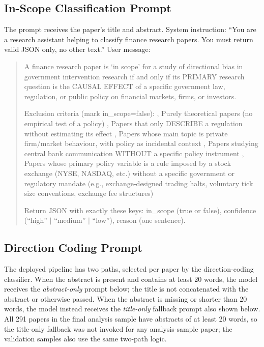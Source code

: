\documentclass[12pt]{article}
\begin{document}
\subsection{In-Scope Classification Prompt}

The prompt receives the paper's title and abstract.
System instruction: ``You are a research assistant helping to classify
finance research papers. You must return valid JSON only, no other text.''
User message:

\begin{quote}
\small
A finance research paper is `in scope' for a study of directional bias
in government intervention research if and only if its PRIMARY research
question is the CAUSAL EFFECT of a specific government law, regulation,
or public policy on financial markets, firms, or investors.

Exclusion criteria (mark in\_scope=false):
\newline, Purely theoretical papers (no empirical test of a policy)
\newline, Papers that only DESCRIBE a regulation without estimating its effect
\newline, Papers whose main topic is private firm/market behaviour, with policy as incidental context
\newline, Papers studying central bank communication WITHOUT a specific policy instrument
\newline, Papers whose primary policy variable is a rule imposed by a stock exchange
(NYSE, NASDAQ, etc.) without a specific government or regulatory mandate
(e.g., exchange-designed trading halts, voluntary tick size conventions,
exchange fee structures)

Return JSON with exactly these keys: in\_scope (true or false),
confidence (``high'' $|$ ``medium'' $|$ ``low''), reason (one sentence).
\end{quote}

\subsection{Direction Coding Prompt}

The deployed pipeline has two paths, selected per paper by the
direction-coding classifier.  When the abstract is present and
contains at least 20 words, the model receives the
\textit{abstract-only} prompt below; the title is not
concatenated with the abstract or otherwise passed.  When the abstract is missing or
shorter than 20 words, the model instead receives the \textit{title-only}
fallback prompt also shown below.  All 291 papers in the final analysis
sample have abstracts of at least 20 words, so the title-only fallback
was not invoked for any analysis-sample paper; the validation samples
also use the same two-path logic.
\end{document}
